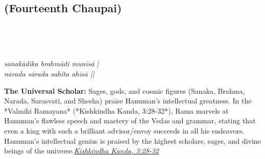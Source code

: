 
\newpage

\subsection*{ (Fourteenth Chaupai)}

\begin{minipage}[t]{0.55\textwidth}
\vspace{0pt}

{\large \linespread{1.5}\selectfont
{}\\
\par}

\vspace{0.5em}

{\large \linespread{1.5}\selectfont
{}\\
\par}

\vspace{0.5em}

{\large \linespread{1.3}\selectfont
\textit{sanakādika brahmādi munīsā |}\\
\textit{nārada sārada sahita ahīsā ||}
\par}
\end{minipage}%
\hfill
\begin{minipage}[t]{0.42\textwidth}
\vspace{0pt}
\begin{tcolorbox}[anchorbox]
\textbf{The Universal Scholar:} Sages, gods, and cosmic figures (Sanaka, Brahma, Narada, Sarasvati, and Shesha) praise Hanuman's intellectual greatness. In the *Valmiki Ramayana* (*Kishkindha Kanda, 3:28-32*), Rama marvels at Hanuman's flawless speech and mastery of the Vedas and grammar, stating that even a king with such a brilliant advisor/envoy succeeds in all his endeavors.
\vspace{0.5em}\newline Hanuman's intellectual genius is praised by the highest scholars, sages, and divine beings of the universe.\newline\null\hfill\href{https://www.valmiki.iitk.ac.in/sloka?field_kanda_tid=4&language=dv&field_sarga_value=3}{\textit{Kishkindha Kanda, 3:28-32}}
\end{tcolorbox}
\end{minipage}

